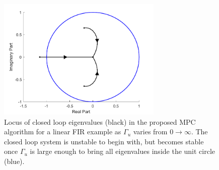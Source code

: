 \begin{figure}[!h]
\centering
\includegraphics[width = 0.7\textwidth]{Chapter10_NMPC/LinearEigenvalueLocus.pdf}
\caption{Locus of closed loop eigenvalues (black) in the proposed MPC algorithm for a linear FIR example as $\Gamma_u$ varies from $0 \rightarrow \infty$. The closed loop system is unstable to begin with, but becomes stable once $\Gamma_u$ is large enough to bring all eigenvalues inside the unit circle (blue).}
\label{fig:LinearEigenvalueLocus}
\end{figure}

%
%
%
%
%
%

